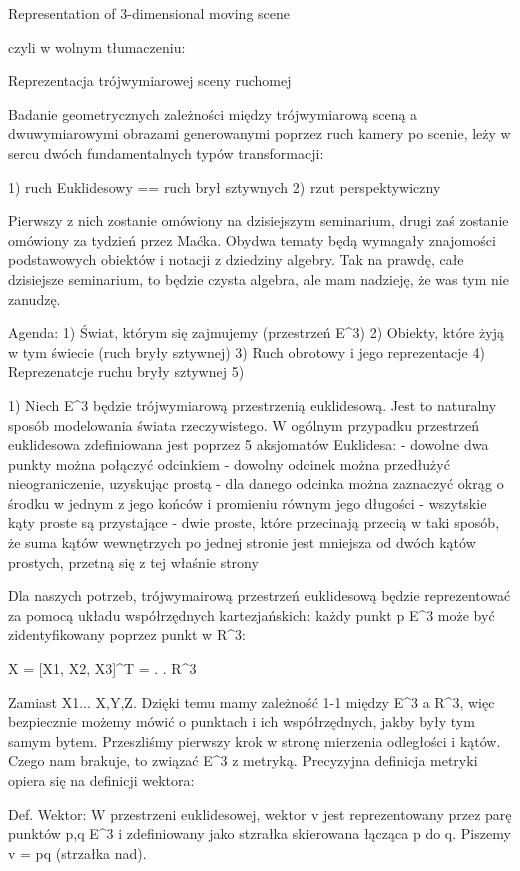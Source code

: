 Representation of 3-dimensional moving scene

czyli w wolnym tłumaczeniu:

Reprezentacja trójwymiarowej sceny ruchomej

Badanie geometrycznych zależności między trójwymiarową sceną a dwuwymiarowymi obrazami generowanymi poprzez ruch kamery po scenie, leży w sercu dwóch fundamentalnych typów transformacji:

1) ruch Euklidesowy == ruch brył sztywnych
2) rzut perspektywiczny

Pierwszy z nich zostanie omówiony na dzisiejszym seminarium, drugi zaś zostanie omówiony za tydzień przez Maćka. Obydwa tematy będą wymagały znajomości podstawowych obiektów i notacji z dziedziny algebry. Tak na prawdę, całe dzisiejsze seminarium, to będzie czysta algebra, ale mam nadzieję, że was tym nie zanudzę.

Agenda:
1) Świat, którym się zajmujemy (przestrzeń E^3)
2) Obiekty, które żyją w tym świecie (ruch bryły sztywnej)
3) Ruch obrotowy i jego reprezentacje
4) Reprezenatcje ruchu bryły sztywnej 
5) 

1) Niech E^3 będzie trójwymiarową przestrzenią euklidesową. Jest to naturalny sposób modelowania świata rzeczywistego. W ogólnym przypadku przestrzeń euklidesowa zdefiniowana jest poprzez 5 aksjomatów Euklidesa:
- dowolne dwa punkty można połączyć odcinkiem
- dowolny odcinek można przedłużyć nieograniczenie, uzyskując prostą
- dla danego odcinka można zaznaczyć okrąg o środku w jednym z jego końców i promieniu równym jego długości
- wszytskie kąty proste są przystające
- dwie proste, które przecinają przecią w taki sposób, że suma kątów wewnętrzych po jednej stronie jest mniejsza od dwóch kątów prostych, przetną się z tej właśnie strony

Dla naszych potrzeb, trójwymairową przestrzeń euklidesową będzie reprezentować za pomocą układu współrzędnych kartezjańskich: każdy punkt p \in E^3 może być zidentyfikowany poprzez punkt w R^3:

X = [X1, X2, X3]^T = . . \in R^3

Zamiast X1... X,Y,Z. Dzięki temu mamy zależność 1-1 między E^3 a R^3, więc bezpiecznie możemy mówić o punktach i ich współrzędnych, jakby były tym samym bytem. Przeszliśmy pierwszy krok w stronę mierzenia odległości i kątów. Czego nam brakuje, to związać E^3 z metryką. Precyzyjna definicja metryki opiera się na definicji wektora:

Def. Wektor: W przestrzeni euklidesowej, wektor v jest reprezentowany przez parę punktów p,q \in E^3 i zdefiniowany jako stzrałka skierowana łącząca p do q. Piszemy v = pq (strzałka nad).

